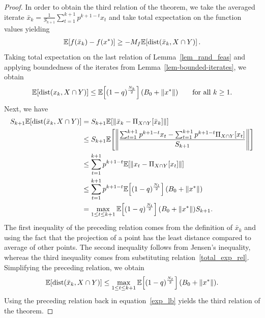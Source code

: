 \documentclass{article}
\def\dist{{\rm dist}}
\newcommand{\EXP}[1]
{\mathbb{E}\!\left[#1\right] }
\theoremstyle{plain}
\theoremstyle{definition}
\theoremstyle{remark}
\begin{document}
\begin{proof}
In order to obtain the third relation of the theorem, we take the averaged iterate $\bar x_k = \frac{1}{S_{k+1}}\sum_{t=1}^{k+1} p^{k+1-t} x_t$ and take total expectation on the function values yielding
\begin{align}
    \EXP{f(\bar x_k)-f(x^*)} \geq - M_f \EXP{\dist(\bar x_k, X \cap Y)} . \label{exp_lb} 
\end{align}
Taking total expectation on the last relation of Lemma~\ref{lem_rand_feas} and applying boundedness of the iterates from Lemma~\ref{lem-bounded-iterates}, we obtain
\begin{align}
    \EXP{\dist(x_{k},X \cap Y)} \leq \EXP{(1-q)^{\frac{N_{k}}{2}}} (B_0 + \|x^*\|) \qquad \text{for all } k \geq 1 . \label{total_exp_rel}
\end{align}
Next, we have
\begin{align}
    S_{k+1} \EXP{\dist(\bar x_k,X \cap Y)} &= S_{k+1} \EXP{\| \bar x_k - \Pi_{X \cap Y}[\bar x_k] \|} \nonumber\\
    &\leq S_{k+1} \EXP{\left\| \frac{\sum_{t=1}^{k+1} p^{k+1-t} x_t - \sum_{t=1}^{k+1} p^{k+1-t} \Pi_{X \cap Y}[x_t]}{S_{k+1}} \right\|} \nonumber\\
    &\leq \sum_{t=1}^{k+1} p^{k+1-t} \EXP{\|x_t - \Pi_{X \cap Y}[x_t]\|} \nonumber\\
    & \leq \sum_{t=1}^{k+1} p^{k+1-t} \EXP{(1-q)^{\frac{N_{t}}{2}}}  (B_0 + \|x^*\|) \nonumber\\
    & = \max_{1 \leq t \leq k+1} \EXP{(1-q)^{\frac{N_{t}}{2}}} (B_0 + \|x^*\|) S_{k+1} . \nonumber
\end{align}
The first inequality of the preceding relation comes from the definition of $\bar x_k$ and using the fact that the projection of a point has the least distance compared to average of other points. The second inequality follows from Jensen's inequality, whereas the third inequality comes from substituting relation~\eqref{total_exp_rel}. Simplifying the preceding relation, we obtain
\begin{align}
    \EXP{\dist(\bar x_k,X \cap Y)} \leq \max_{1 \leq t \leq k+1} \EXP{(1-q)^{\frac{N_{t}}{2}}} (B_0 + \|x^*\|) . \nonumber
\end{align}
Using the preceding relation back in equation~\eqref{exp_lb} yields the third relation of the theorem.
\end{proof}
\end{document}
